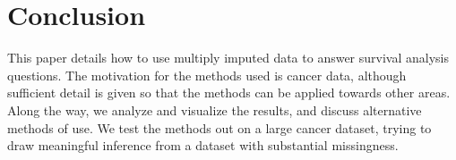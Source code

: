 \chapter{Conclusion}
This paper details how to use multiply imputed data to answer survival analysis questions. The motivation for the methods used is cancer data, although sufficient detail is given so that the methods can be applied towards other areas. Along the way, we analyze and visualize the results, and discuss alternative methods of use. We test the methods out on a large cancer dataset, trying to draw meaningful inference from a dataset with substantial missingness.


